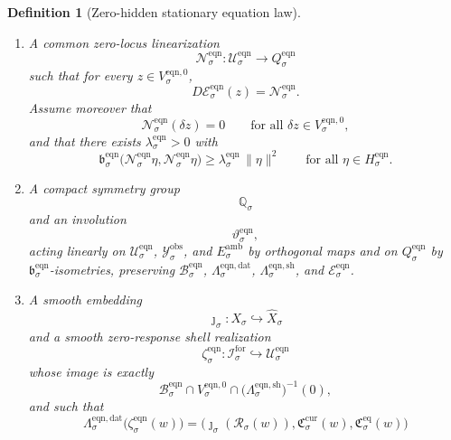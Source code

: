 \documentclass[11pt]{article}
\newcommand{\ForSpace}[1]{\mathcal I_{#1}^{\mathrm{for}}}
\newcommand{\Reduction}[1]{\mathcal R_{#1}}
\newcommand{\CurrentCarrier}[1]{\mathfrak C_{#1}^{\mathrm{cur}}}
\newcommand{\EqCarrier}[1]{\mathfrak C_{#1}^{\mathrm{eq}}}
\newcommand{\VisibleAffine}[1]{\widehat X_{#1}}
\newcommand{\DataSpace}[1]{\mathcal Y_{#1}^{\mathrm{obs}}}
\newcommand{\AmbientTarget}[1]{E_{#1}^{\mathrm{amb}}}
\newcommand{\EqnSpace}[1]{\mathcal U_{#1}^{\mathrm{eqn}}}
\newcommand{\EqnBody}[1]{\mathcal B_{#1}^{\mathrm{eqn}}}
\newcommand{\EqnData}[1]{\Lambda_{#1}^{\mathrm{eqn,dat}}}
\newcommand{\EqnShell}[1]{\Lambda_{#1}^{\mathrm{eqn,sh}}}
\newcommand{\EqnTarget}[1]{Q_{#1}^{\mathrm{eqn}}}
\newcommand{\EqnPair}[1]{\mathfrak b_{#1}^{\mathrm{eqn}}}
\newcommand{\EqnResidual}[1]{\mathcal E_{#1}^{\mathrm{eqn}}}
\newcommand{\EqnZero}[1]{V_{#1}^{\mathrm{eqn},0}}
\newcommand{\EqnHidden}[1]{H_{#1}^{\mathrm{eqn}}}
\newcommand{\EqnHiddenBody}[1]{D_{#1}^{\mathrm{eqn}}}
\newcommand{\EqnLin}[1]{\mathcal N_{#1}^{\mathrm{eqn}}}
\newcommand{\EqnSym}[1]{\mathbb Q_{#1}}
\newcommand{\EqnTime}[1]{\vartheta_{#1}^{\mathrm{eqn}}}
\newcommand{\EqnEmbed}[1]{\zeta_{#1}^{\mathrm{eqn}}}
\newtheorem{definition}{Definition}
\begin{document}
\begin{definition}[Zero-hidden stationary equation law]
\begin{enumerate}
\[    \]
    such that the equation state body splits exactly as
    \begin{equation}
    \EqnBody{\sigma}
    =
    \left\{
    z+\eta:
    z\in\EqnBody{\sigma}\cap\EqnZero{\sigma},
    \quad
    \eta\in\EqnHiddenBody{\sigma}
    \right\}.
    \label{eq:eqnsplitting}
    \end{equation}
    \item A common zero-locus linearization
    \[
    \EqnLin{\sigma}:\EqnSpace{\sigma}\to\EqnTarget{\sigma}
    \]
    such that for every \(z\in\EqnZero{\sigma}\),
    \begin{equation}
    D\EqnResidual{\sigma}(z)=\EqnLin{\sigma}.
    \label{eq:eqnlinearization}
    \end{equation}
    Assume moreover that
    \begin{equation}
    \EqnLin{\sigma}(\delta z)=0
    \qquad
    \text{for all }\delta z\in\EqnZero{\sigma},
    \label{eq:eqnzero}
    \end{equation}
    and that there exists \(\lambda_{\sigma}^{\mathrm{eqn}}>0\) with
    \begin{equation}
    \EqnPair{\sigma}\bigl(\EqnLin{\sigma}\eta,\EqnLin{\sigma}\eta\bigr)
    \ge
    \lambda_{\sigma}^{\mathrm{eqn}}\,
    \|\eta\|^{2}
    \qquad
    \text{for all }\eta\in\EqnHidden{\sigma}.
    \label{eq:eqngap}
    \end{equation}
    \item A compact symmetry group
    \[
    \EqnSym{\sigma}
    \]
    and an involution
    \[
    \EqnTime{\sigma},
    \]
    acting linearly on \(\EqnSpace{\sigma}\), \(\DataSpace{\sigma}\), and \(\AmbientTarget{\sigma}\) by orthogonal maps and on \(\EqnTarget{\sigma}\) by \(\EqnPair{\sigma}\)-isometries, preserving \(\EqnBody{\sigma}\), \(\EqnData{\sigma}\), \(\EqnShell{\sigma}\), and \(\EqnResidual{\sigma}\).
    \item A smooth embedding
    \[
    \jmath_{\sigma}:X_{\sigma}\hookrightarrow\VisibleAffine{\sigma}
    \]
    and a smooth zero-response shell realization
    \[
    \EqnEmbed{\sigma}:\ForSpace{\sigma}\hookrightarrow\EqnSpace{\sigma}
    \]
    whose image is exactly
    \[
    \EqnBody{\sigma}\cap
    \EqnZero{\sigma}\cap
    \bigl(\EqnShell{\sigma}\bigr)^{-1}(0),
    \]
    and such that
    \begin{equation}
    \EqnData{\sigma}\bigl(\EqnEmbed{\sigma}(w)\bigr)
    =
    \bigl(
    \jmath_{\sigma}(\Reduction{\sigma}(w)),
    \CurrentCarrier{\sigma}(w),
    \EqCarrier{\sigma}(w)
    \bigr)
    \label{eq:eqncompat}

\end{equation}
\end{enumerate}
\end{definition}
\end{document}
